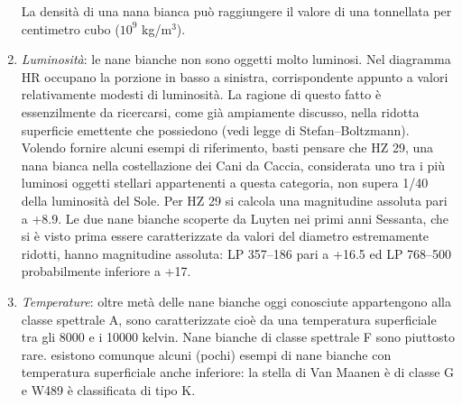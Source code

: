 \begin{enumerate}
La densit\`{a} di una nana bianca può raggiungere il valore di una tonnellata per centimetro cubo ($10^{9}$ kg/m$^{3}$).
\item
\emph{Luminosit\`{a}}:
le nane bianche non sono oggetti molto luminosi. Nel diagramma HR occupano la porzione in basso a sinistra, corrispondente appunto a valori relativamente modesti di luminosit\`{a}. La ragione di questo fatto è essenzilmente da ricercarsi, come gi\`{a} ampiamente discusso, nella ridotta superficie emettente che possiedono (vedi legge di Stefan--Boltzmann).
Volendo fornire alcuni esempi di riferimento, basti pensare che HZ 29, una nana bianca nella costellazione dei Cani da Caccia, considerata uno tra i più luminosi oggetti stellari appartenenti a questa categoria, non supera 1/40 della luminosit\`{a} del Sole. Per HZ 29 si calcola una magnitudine assoluta pari a +8.9. Le due nane bianche scoperte da Luyten nei primi anni Sessanta, che si è visto prima essere caratterizzate da valori del diametro estremamente ridotti, hanno magnitudine assoluta: LP 357--186 pari a +16.5 ed LP 768--500 probabilmente inferiore a +17.
\item 
\emph{Temperature}:
oltre met\`{a} delle nane bianche oggi conosciute appartengono alla classe spettrale A, sono caratterizzate cioè da una temperatura superficiale tra gli 8000 e i 10000 kelvin. Nane bianche di classe spettrale F sono piuttosto rare. esistono comunque alcuni (pochi) esempi di nane bianche con temperatura superficiale anche inferiore: la stella di Van Maanen è di classe G e W489 è classificata di tipo K.
\end{enumerate}


